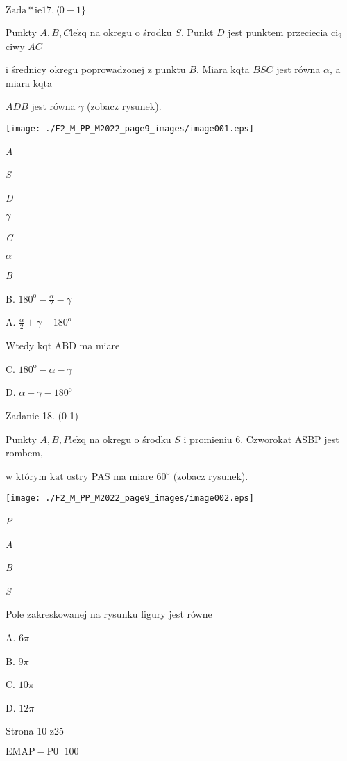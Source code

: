 \documentclass[a4paper,12pt]{article}
\begin{document}
$\mathrm{Z}\mathrm{a}\mathrm{d}\mathrm{a}*\mathrm{i}\mathrm{e}17, \langle 0-1\}$

Punkty $A, B, C \mathrm{l}\mathrm{e}\dot{\mathrm{z}}\mathrm{q}$ na okregu o środku $S$. Punkt $D$ jest punktem przeciecia $\mathrm{c}\mathrm{i}_{9}$ciwy $AC$

i średnicy okregu poprowadzonej z punktu $B$. Miara kqta $BSC$ jest równa $\alpha$, a miara kqta

$ADB$ jest równa $\gamma$ (zobacz rysunek).
\begin{center}
\texttt{[image: ./F2\_M\_PP\_M2022\_page9\_images/image001.eps]}
\end{center}
{\it A}

{\it S}

{\it D}

$\gamma$

{\it C}

$\alpha$

{\it B}

B. $ 180^{\mathrm{o}}-\displaystyle \frac{\alpha}{2}-\gamma$

A. $\displaystyle \frac{\alpha}{2}+\gamma-180^{\mathrm{o}}$

Wtedy kqt ABD ma miare

C. $ 180^{\mathrm{o}}-\alpha-\gamma$

D. $\alpha+\gamma-180^{\mathrm{o}}$

Zadanie 18. (0-1)

Punkty $A, B, P \mathrm{l}\mathrm{e}\dot{\mathrm{z}}\mathrm{q}$ na okregu o środku $S$ i promieniu 6. Czworokat ASBP jest rombem,

w którym $\mathrm{k}\mathrm{a}\mathrm{t}$ ostry PAS ma miare $60^{\mathrm{o}}$ (zobacz rysunek).
\begin{center}
\texttt{[image: ./F2\_M\_PP\_M2022\_page9\_images/image002.eps]}
\end{center}
{\it P}

{\it A}

{\it B}

{\it S}

Pole zakreskowanej na rysunku figury jest równe

A. $ 6\pi$

B. $ 9\pi$

C. $ 10\pi$

D. $ 12\pi$

Strona 10 z25

$\mathrm{E}\mathrm{M}\mathrm{A}\mathrm{P}-\mathrm{P}0_{-}100$
\end{document}
